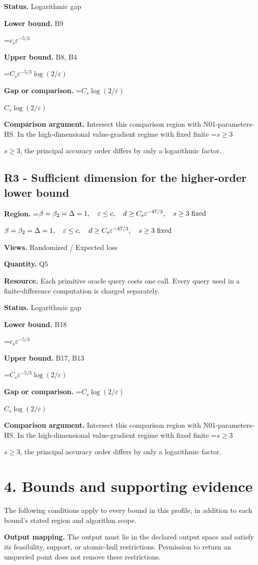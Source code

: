 \documentclass[10pt,a4paper]{article}
\newcommand{\AtlasMath}[1]{\par\begingroup\centering\setbox0=\hbox{$\displaystyle #1$}\ifdim\wd0>1.4\linewidth\typeout{ATLAS WIDE FORMULA: \the\wd0}\fi\ifdim\wd0>\linewidth\resizebox{\linewidth}{!}{\box0}\else\box0\fi\par\endgroup}
\newcommand{\AtlasInlineMath}[1]{\begingroup\setbox0=\hbox{$#1$}\ifdim\wd0>.4\linewidth\endgroup\AtlasMath{#1}\else\endgroup$#1$\fi}
\begin{document}
\textbf{Status.} Logarithmic gap

\textbf{Lower bound.} B9

\AtlasMath{c_s\varepsilon^{-5/3}}
\textbf{Upper bound.} B8, B4

\AtlasMath{C_s\varepsilon^{-5/3}\log(2/\varepsilon)}
\textbf{Gap or comparison.} \AtlasInlineMath{C_s\log(2/\varepsilon)}

\textbf{Comparison argument.} Intersect this comparison region with N01-parameters-HS. In the high-dimensional value-gradient regime with fixed finite \AtlasInlineMath{s\ge3}, the principal accuracy order differs by only a logarithmic factor.

\subsection{R3 - Sufficient dimension for the higher-order lower bound}
\textbf{Region.} \AtlasInlineMath{\beta=\beta_2=\Delta=1,\quad\varepsilon\le c,\quad d\ge C_s\varepsilon^{-47/3},\quad s\ge3\text{ \text{fixed}}}

\textbf{Views.} Randomized / Expected loss

\textbf{Quantity.} Q5

\textbf{Resource.} Each primitive oracle query costs one call. Every query used in a finite-difference computation is charged separately.

\textbf{Status.} Logarithmic gap

\textbf{Lower bound.} B18

\AtlasMath{c_s\varepsilon^{-5/3}}
\textbf{Upper bound.} B17, B13

\AtlasMath{C_s\varepsilon^{-5/3}\log(2/\varepsilon)}
\textbf{Gap or comparison.} \AtlasInlineMath{C_s\log(2/\varepsilon)}

\textbf{Comparison argument.} Intersect this comparison region with N01-parameters-HS. In the high-dimensional value-gradient regime with fixed finite \AtlasInlineMath{s\ge3}, the principal accuracy order differs by only a logarithmic factor.

\section{4. Bounds and supporting evidence}
The following conditions apply to every bound in this profile, in addition to each bound's stated region and algorithm scope.

\textbf{Output mapping.} The output must lie in the declared output space and satisfy its feasibility, support, or atomic-hull restrictions. Permission to return an unqueried point does not remove these restrictions.
\end{document}
